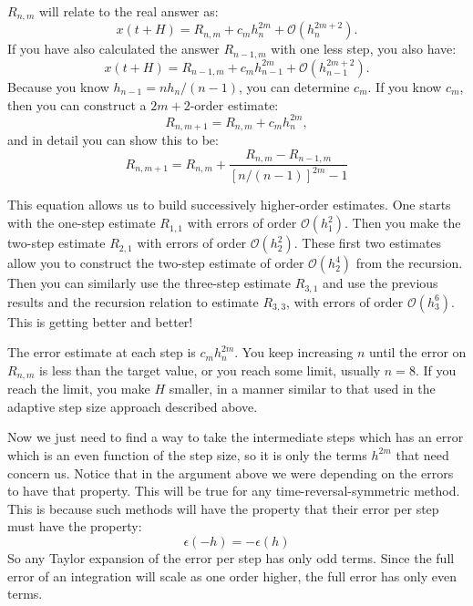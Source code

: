 $R_{n,m}$ will relate to the real answer as:
\begin{equation}
x(t+H) = R_{n,m} + c_m h_n^{2m} + \mathcal{O}(h_n^{2m+2}).
\end{equation}
If you have also calculated the answer $R_{n-1,m}$ with one less step,
you also have:
\begin{equation}
x(t+H) = R_{n-1,m} + c_m h_{n-1}^{2m} + \mathcal{O}(h_{n-1}^{2m+2}).
\end{equation}
Because you know $h_{n-1} = n h_n / (n-1)$, you can determine $c_m$.
If you know $c_m$, then you can construct a $2m+2$-order estimate:
\begin{equation}
  R_{n,m+1} = R_{n,m} +c_mh_n^{2m},
\end{equation}
and in detail you can show this to be:
\begin{equation}
  R_{n,m+1} = R_{n,m} + \frac{R_{n,m} - R_{n-1,
      m}}{\left[n/(n-1)\right]^{2m} -1}
\end{equation}

This equation allows us to build successively higher-order
estimates. One starts with the one-step estimate $R_{1,1}$ with errors
of order $\mathcal{O}(h_1^2)$. Then you make the two-step estimate
$R_{2,1}$ with errors of order $\mathcal{O}(h_2^2)$. These first two
estimates allow you to construct the two-step estimate of order
$\mathcal{O}(h_2^4)$ from the recursion. Then you can similarly use
the three-step estimate $R_{3,1}$ and use the previous results and the
recursion relation to estimate $R_{3,3}$, with errors of order
$\mathcal{O}(h_3^6)$. This is getting better and better!

The error estimate at each step is $c_mh_n^{2m}$. You keep increasing
$n$ until the error on $R_{n,m}$ is less than the target value, or you
reach some limit, usually $n=8$. If you reach the limit, you make $H$
smaller, in a manner similar to that used in the adaptive step size
approach described above.

Now we just need to find a way to take the intermediate steps which
has an error which is an even function of the step size, so it is only
the terms $h^{2m}$ that need concern us. Notice that in the argument
above we were depending on the errors to have that property. This will
be true for any time-reversal-symmetric method. This is because such
methods will have the property that their error per step must have the
property:
\begin{equation}
\epsilon(-h) = - \epsilon(h)
\end{equation}
So any Taylor expansion of the error per step has only odd
terms. Since the full error of an integration will scale as one order
higher, the full error has only even terms.

